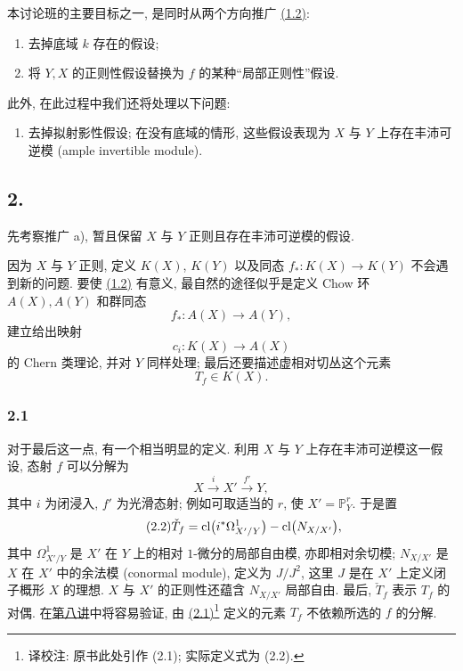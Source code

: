 本讨论班的主要目标之一, 是同时从两个方向推广 \hyperlink{sga6.e00.eq.1-2}{(1.2)}:
\begin{enumerate}[label=\alph*)]
\item 去掉底域 $k$ 存在的假设;
\item 将 $Y,X$ 的正则性假设替换为 $f$ 的某种“局部正则性”假设.
\end{enumerate}
此外, 在此过程中我们还将处理以下问题:
\begin{enumerate}[label=\alph*),start=3]
\item 去掉拟射影性假设; 在没有底域的情形, 这些假设表现为 $X$ 与 $Y$ 上存在丰沛可逆模 (ample invertible module).
\end{enumerate}

\subsection*{2.}
先考察推广 a), 暂且保留 $X$ 与 $Y$ 正则且存在丰沛可逆模的假设.

因为 $X$ 与 $Y$ 正则, 定义 $K(X)$, $K(Y)$ 以及同态 $f_*:K(X)\to K(Y)$ 不会遇到新的问题. 要使 \hyperlink{sga6.e00.eq.1-2}{(1.2)} 有意义, 最自然的途径似乎是定义 Chow 环 $A(X),A(Y)$ 和群同态
\[
f_*:A(X)\longrightarrow A(Y),
\]
建立给出映射
\[
c_i:K(X)\longrightarrow A(X)
\]
的 Chern 类理论, 并对 $Y$ 同样处理; 最后还要描述虚相对切丛这个元素
\[
T_f\in K(X).
\]

\subsubsection*{2.1}
对于最后这一点, 有一个相当明显的定义. 利用 $X$ 与 $Y$ 上存在丰沛可逆模这一假设, 态射 $f$ 可以分解为
\begin{equation}\tag{2.1}
X\xrightarrow{i}X'\xrightarrow{f'}Y,
\end{equation}
其中 $i$ 为闭浸入, $f'$ 为光滑态射; 例如可取适当的 $r$, 使 $X'=\mathbb P^r_Y$. 于是置
\begin{equation}\tag{2.2}
\check T_f=\operatorname{cl}\bigl(i^*\Omega^1_{X'/Y}\bigr)-\operatorname{cl}\bigl(N_{X/X'}\bigr),
\end{equation}
其中 $\Omega^1_{X'/Y}$ 是 $X'$ 在 $Y$ 上的相对 $1$-微分的局部自由模, 亦即相对余切模; $N_{X/X'}$ 是 $X$ 在 $X'$ 中的余法模 (conormal module), 定义为 $J/J^2$, 这里 $J$ 是在 $X'$ 上定义闭子概形 $X$ 的理想. $X$ 与 $X'$ 的正则性还蕴含 $N_{X/X'}$ 局部自由. 最后, $\check T_f$ 表示 $T_f$ 的对偶. 在\hyperlink{sga6.e08.expose}{第八讲}中将容易验证, 由 \hyperlink{sga6.e00.eq.2-1}{(2.1)}\footnote{译校注: 原书此处引作 (2.1); 实际定义式为 (2.2).} 定义的元素 $T_f$ 不依赖所选的 $f$ 的分解.

